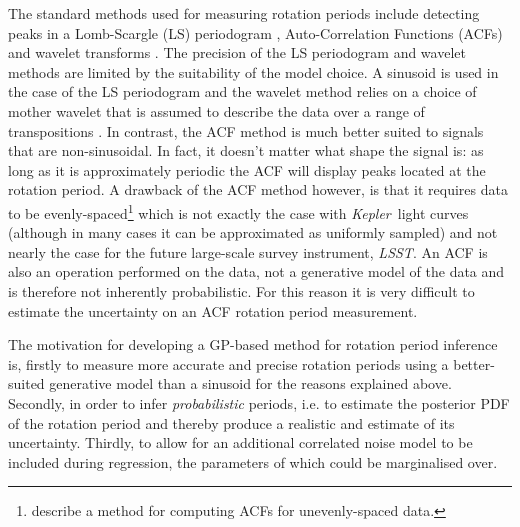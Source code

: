 \documentclass[useAMS, usenatbib, preprint, 12pt]{aastex}
\newcommand{\Kepler}{{\it Kepler}}
\newcommand{\LSST}{{\it LSST}}
\newcommand{\eg}{{\it e.g.}}
\begin{document}
The standard methods used for measuring rotation periods include detecting
peaks in a Lomb-Scargle \citep{Lomb1976, Scargle1982} (LS) periodogram
\citep[e.g.][]{Reinhold2013}, Auto-Correlation Functions (ACFs)
\citep{Mcquillan2013} and wavelet transforms \citep{Garcia2014}.
The precision of the LS periodogram and wavelet methods are limited by the
suitability of the model choice.
A sinusoid is used in the case of the LS periodogram and the wavelet method
relies on a choice of mother wavelet that is assumed to describe the data over
a range of transpositions \citep[see, \eg][]{Carter2010}.
In contrast, the ACF method is much better suited to signals that are
non-sinusoidal.
In fact, it doesn't matter what shape the signal is: as long as it is
approximately periodic the ACF will display peaks located at the rotation
period.
A drawback of the ACF method however, is that it requires data to be
evenly-spaced\footnote{\citet{Edelson1988} describe a method for computing
ACFs for unevenly-spaced data.} which is not exactly the case with \Kepler\
light curves (although in many cases it can be approximated as uniformly
sampled) and not nearly the case for the future large-scale survey instrument,
\LSST.
An ACF is also an operation performed on the data, not a generative model of
the data and is therefore not inherently probabilistic.
For this reason it is very difficult to estimate the uncertainty on an ACF
rotation period measurement.

The motivation for developing a GP-based method for rotation period inference
is, firstly to measure more accurate and precise rotation periods using a
better-suited generative model than a sinusoid for the reasons explained
above.
Secondly, in order to infer {\it probabilistic} periods, i.e. to estimate the
posterior PDF of the rotation period and thereby produce a realistic and
estimate of its uncertainty.
Thirdly, to allow for an additional correlated noise model to be included
during regression, the parameters of which could be marginalised over.
\end{document}

